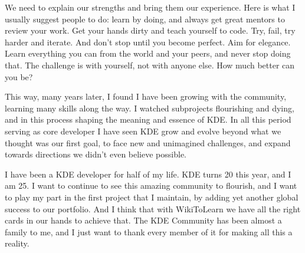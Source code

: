 We need to explain our strengths and bring them our experience. Here is what I usually suggest people to do: learn by doing, and always get great mentors to review your work. Get your hands dirty and teach yourself to code. Try, fail, try harder and iterate. And don't stop until you become perfect. Aim for elegance. Learn everything you can from the world and your peers, and never stop doing that. The challenge is with yourself, not with anyone else. How much better can you be?

This way, many years later, I found I have been growing with the community, learning many skills along the way. I watched subprojects flourishing and dying, and in this process shaping the meaning and essence of KDE. In all this period serving as core developer I have seen KDE grow and evolve beyond what we thought was our first goal, to face new and unimagined challenges, and expand towards directions we didn't even believe possible.

I have been a KDE developer for half of my life. KDE turns 20 this year, and I am 25. I want to continue to see this amazing community to flourish, and I want to play my part in the first project that I maintain, by adding yet another global success to our portfolio. And I think that with WikiToLearn we have all the right cards in our hands to achieve that.
The KDE Community has been almost a family to me, and I just want to thank every member of it for making all this a reality.
